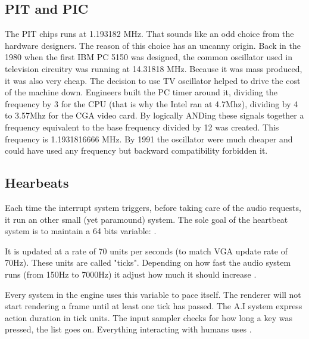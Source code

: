 \subsection{PIT and PIC}
The PIT chips runs at 1.193182 MHz. That sounds like an odd choice from the hardware designers. The reason of this choice has an uncanny origin. Back in the 1980 when the first IBM PC 5150 was designed, the common oscillator used in television circuitry was running at 14.31818 MHz. Because it was mass produced, it was also very cheap. The decision to use TV oscillator helped to drive the cost of the machine down. Engineers built the PC timer around it, dividing the frequency by 3 for the CPU (that is why the Intel ran at 4.7Mhz), dividing by 4 to 3.57Mhz for the CGA video card. By logically ANDing these signals together a frequency equivalent to the base frequency divided by 12 was created. This frequency is 1.1931816666 MHz. By 1991 the oscillator were much cheaper and could have used any frequency but backward compatibility forbidden it.\\
\par














\subsection{Hearbeats}
Each time the interrupt system triggers, before taking care of the audio requests, it run an other small (yet paramound) system. The sole goal of the heartbeat system is to maintain a 64 bits variable: .\\
\par
\begin{minipage}{\textwidth}

\end{minipage}
\par
It is updated at a rate of 70 units per seconds (to match VGA update rate of 70Hz). These units are called "ticks". Depending on how fast the audio system runs (from 150Hz to 7000Hz) it adjust how much it should increase .\\
\par
Every system in the engine uses this variable to pace itself. The renderer will not start rendering a frame until at least one tick has passed. The A.I system express action duration in tick units. The input sampler checks for how long a key was pressed, the list goes on. Everything interacting with humans uses .\\














